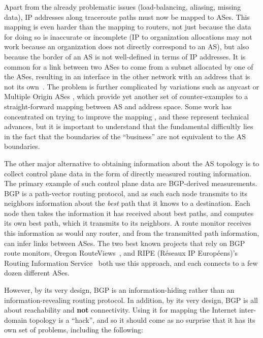Apart from the already problematic issues (\eg load-balancing,
aliasing, missing data), IP addresses along traceroute paths must now
be mapped to ASes.  This mapping is even harder than the mapping to
routers, not just because the data for doing so is inaccurate or
incomplete (\eg IP to organization allocations may not work because
an organization does not directly correspond to an AS), but also
because the border of an AS is not well-defined in terms of IP
addresses. It is common for a link between two ASes to come from a
subnet allocated by one of the ASes, resulting in an interface in the
other network with an address that is not its
own~\cite{mao03:_as-tr,marchetta13:_detec_third_addres_tracer_traces}.
The problem is further complicated by variations such as anycast or
Multiple Origin ASes \cite{Zhao01:_MOAS}, which provide yet another
set of counter-examples to a straight-forward mapping between AS and
address space. Some work has concentrated on trying to improve the
mapping \cite{pansiot10:_extrac}, and these represent technical
advances, but it is important to understand that the fundamental
difficultly lies in the fact that the boundaries of the ``business''
are not equivalent to the AS boundaries.
 
The other major alternative to obtaining information about the AS topology is 
to collect control plane data in the form of directly measured routing information.  
The primary example of such control plane data are BGP-derived measurements. 
BGP is a path-vector routing protocol, and as such each node transmits
to its neighbors information about the {\em best} path that it knows to 
a destination. Each node then takes the information it has received about 
best paths, and computes its own best path, which it transmits to its neighbors.  
A route monitor receives this information as would any router, and from the 
transmitted path information, can infer links between ASes.  The two best known 
projects that rely on BGP route monitors, Oregon RouteViews~\cite{ORVdata}, 
and RIPE (R\'{e}seaux IP Europ\'{e}ens)'s Routing Information Service~\cite{RIPEdata} 
both use this approach, and each connects to a few dozen different ASes.

However, by its very design, BGP is an information-hiding rather than an 
information-revealing routing protocol. In addition, by its very design, 
BGP is all about reachability and {\bf not} connectivity.  Using it for 
mapping the Internet inter-domain topology is a ``hack'', and so it should 
come as no surprise that it has its own set of problems, including the following:

